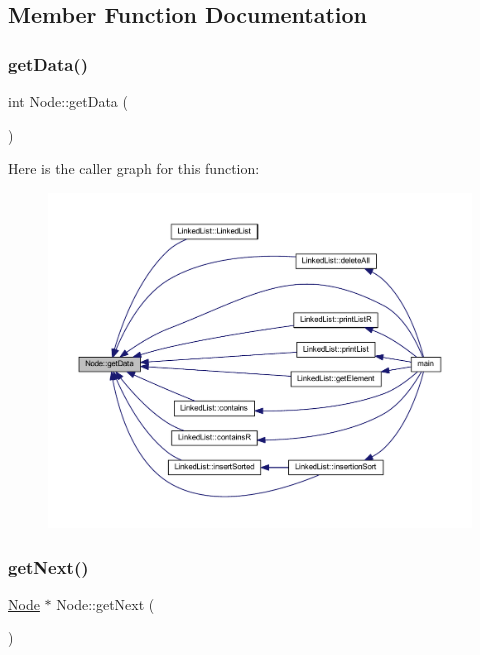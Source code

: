 \subsection{Member Function Documentation}
\mbox{\label{class_node_aca98907146d5d0687f48bf8be9df9b7d}} 
\subsubsection{\texorpdfstring{get\+Data()}{getData()}}
{\footnotesize\ttfamily int Node\+::get\+Data (\begin{DoxyParamCaption}{ }\end{DoxyParamCaption})}

Here is the caller graph for this function\+:
\nopagebreak
\begin{figure}[H]
\begin{center}
\leavevmode
\includegraphics[width=350pt]{class_node_aca98907146d5d0687f48bf8be9df9b7d_icgraph}
\end{center}
\end{figure}
\mbox{\label{class_node_ae36639ff267d63e058ce309fde5a9913}} 
\subsubsection{\texorpdfstring{get\+Next()}{getNext()}}
{\footnotesize\ttfamily \hyperlink{class_node}{Node} $\ast$ Node\+::get\+Next (\begin{DoxyParamCaption}{ }\end{DoxyParamCaption})}

